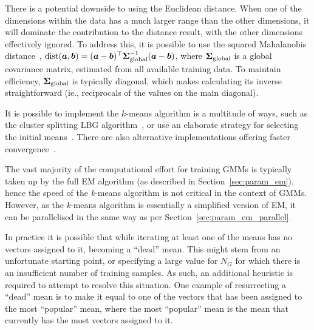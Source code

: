 There is a potential downside to using the Euclidean distance.
When one of the dimensions within the data has a much larger range than the other dimensions,
it will dominate the contribution to the distance result, with the other dimensions effectively ignored.
To address this, it is possible to use the squared Mahalanobis distance~\cite{Bishop_2006,Duda01},
\mbox{$\operatorname{dist}({\boldsymbol{a}}, {\boldsymbol{b}}) = ({\boldsymbol{a}} - {\boldsymbol{b}})^\top {\boldsymbol{\Sigma}}^{-1}_{\mathrm{global}} ({\boldsymbol{a}} - {\boldsymbol{b}})$},
where ${\boldsymbol{\Sigma}}_{\mathrm{global}}$ is a global covariance matrix, estimated from all available training data.
To maintain efficiency, ${\boldsymbol{\Sigma}}_{\mathrm{global}}$ is typically diagonal,
which makes calculating its inverse straightforward (ie., reciprocals of the values on the main diagonal).

It is possible to implement the $k$-means algorithm is a multitude of ways,
such as the cluster splitting LBG algorithm~\cite{Linde80},
or use an elaborate strategy for selecting the initial means~\cite{Arthur_2007}.
There are also alternative implementations offering faster convergence~\cite{Elkan_2003}.

The vast majority of the computational effort for training GMMs is typically taken up by the full EM algorithm (as described in Section~\ref{sec:param_em}),
hence the speed of the {\it k}-means algorithm is not critical in the context of GMMs.
However, as the {\it k}-means algorithm is essentially a simplified version of EM,
it can be parallelised in the same way as per Section~\ref{sec:param_em_parallel}.


In practice it is possible that while iterating at least one of the means has no vectors assigned to it,
becoming a ``dead'' mean.
This might stem from an unfortunate starting point, 
or specifying a large value for $N_G$ for which there is an insufficient number of training samples.
As such, an additional heuristic is required to attempt to resolve this situation.
One example of resurrecting a ``dead'' mean is to make it equal to one of the vectors
that has been assigned to the most ``popular'' mean,
where the most ``popular'' mean is the mean that currently has the most vectors assigned to it.



